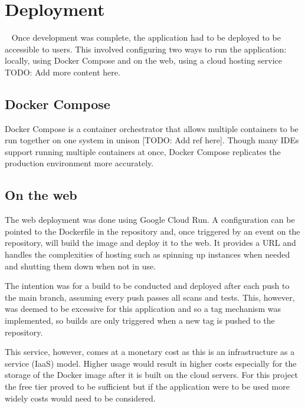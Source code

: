 \chapter{Deployment}~\label{cha:deployment}
Once development was complete, the application had to be deployed to be accessible to users. This involved configuring two ways to run the application: locally, using Docker Compose and on the web, using a cloud hosting service
TODO: Add more content here.

\section{Docker Compose}
Docker Compose is a container orchestrator that allows multiple containers to be run together on one system in unison [TODO: Add ref here]. Though many IDEs support running multiple containers at once, Docker Compose replicates the production environment more accurately.

\section{On the web}
The web deployment was done using Google Cloud Run. A configuration can be pointed to the Dockerfile in the repository and, once triggered by an event on the repository, will build the image and deploy it to the web. It provides a URL and handles the complexities of hosting such as spinning up instances when needed and shutting them down when not in use.

The intention was for a build to be conducted and deployed after each push to the main branch, assuming every push passes all scans and tests. This, however, was deemed to be excessive for this application and so a tag mechanism was implemented, so builds are only triggered when a new tag is pushed to the repository.

This service, however, comes at a monetary cost as this is an infrastructure as a service (IaaS) model. Higher usage would result in higher costs especially for the storage of the Docker image after it is built on the cloud servers. For this project the free tier proved to be sufficient but if the application were to be used more widely costs would need to be considered.

